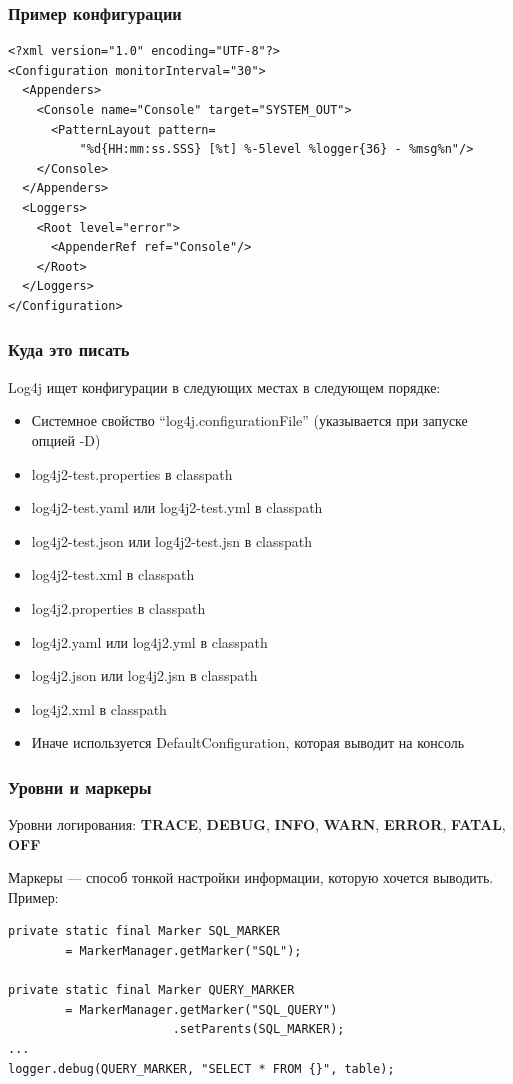 \documentclass[xetex,mathserif,serif]{beamer}
\begin{document}
	\begin{frame}[fragile]
		\frametitle{Пример конфигурации}
		\begin{verbatim}
<?xml version="1.0" encoding="UTF-8"?>
<Configuration monitorInterval="30">
  <Appenders>
    <Console name="Console" target="SYSTEM_OUT">
      <PatternLayout pattern=
          "%d{HH:mm:ss.SSS} [%t] %-5level %logger{36} - %msg%n"/>
    </Console>
  </Appenders>
  <Loggers>
    <Root level="error">
      <AppenderRef ref="Console"/>
    </Root>
  </Loggers>
</Configuration>
		\end{verbatim}
\end{frame}

	\begin{frame}
		\frametitle{Куда это писать}
		Log4j ищет конфигурации в следующих местах в следующем порядке:
		\begin{itemize}
			\item Системное свойство ``log4j.configurationFile'' (указывается при запуске опцией -D)
			\item log4j2-test.properties в classpath
			\item log4j2-test.yaml или log4j2-test.yml в classpath
			\item log4j2-test.json или log4j2-test.jsn в classpath
			\item log4j2-test.xml в classpath
			\item log4j2.properties в classpath
			\item log4j2.yaml или log4j2.yml в classpath
			\item log4j2.json или log4j2.jsn в classpath
			\item log4j2.xml в classpath
			\item Иначе используется DefaultConfiguration, которая выводит на консоль
		\end{itemize}
	\end{frame}

	\begin{frame}[fragile]
		\frametitle{Уровни и маркеры}
		Уровни логирования: \textbf{TRACE}, \textbf{DEBUG}, \textbf{INFO}, \textbf{WARN}, \textbf{ERROR}, \textbf{FATAL}, \textbf{OFF}

		Маркеры --- способ тонкой настройки информации, которую хочется выводить. Пример:
		\begin{verbatim}
private static final Marker SQL_MARKER 
        = MarkerManager.getMarker("SQL");

private static final Marker QUERY_MARKER 
        = MarkerManager.getMarker("SQL_QUERY")
                       .setParents(SQL_MARKER);
...
logger.debug(QUERY_MARKER, "SELECT * FROM {}", table);
		\end{verbatim}
\end{frame}
\end{document}
